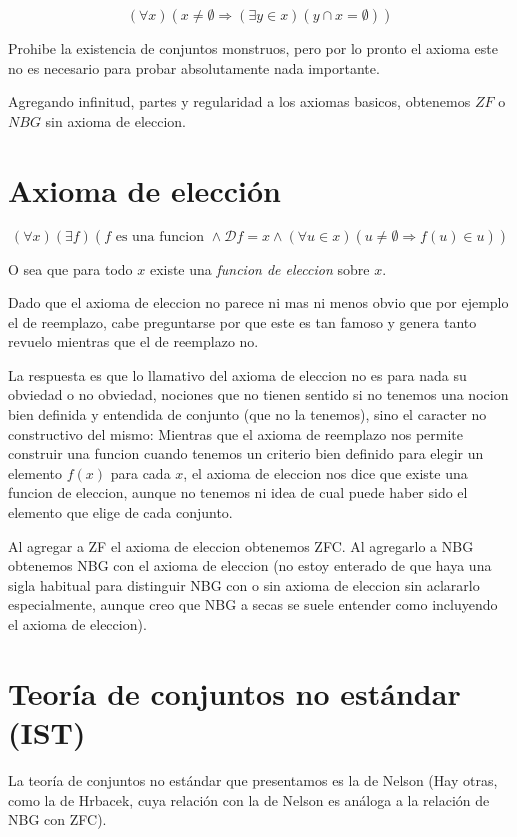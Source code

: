 \documentclass[12pt]{article}
\begin{document}
$$(\forall x) (x \neq \emptyset \Rightarrow (\exists y \in x) (y \cap x = \emptyset))$$

Prohibe la existencia de conjuntos monstruos, pero por lo pronto el axioma este no es necesario para probar absolutamente nada importante.

Agregando infinitud, partes y regularidad a los axiomas basicos, obtenemos $ZF$ o $NBG$ sin axioma de eleccion.

\section{Axioma de elección}


$$(\forall x)(\exists f) (f \mbox{ es una funcion } \wedge \mathcal{D}f = x \wedge (\forall u \in x)(u \neq \emptyset \Rightarrow f(u) \in u))$$

O sea que para todo $x$ existe una \textit{funcion de eleccion} sobre $x$.

Dado que el axioma de eleccion no parece ni mas ni menos obvio que por ejemplo el de reemplazo, cabe preguntarse por que este es tan famoso y
genera tanto revuelo mientras que el de reemplazo no. 

La respuesta es que lo llamativo del axioma de eleccion no es para nada su obviedad o no obviedad, nociones que no tienen
sentido si no tenemos una nocion bien definida y entendida de conjunto (que no la tenemos), sino el caracter no constructivo del mismo:
Mientras que el axioma de reemplazo nos permite construir una funcion cuando tenemos un criterio bien definido para elegir un elemento
$f(x)$ para cada $x$, el axioma de eleccion nos dice que existe una funcion de eleccion, aunque no tenemos ni idea de cual puede haber sido
el elemento que elige de cada conjunto.

Al agregar a ZF el axioma de eleccion obtenemos ZFC. Al agregarlo a NBG obtenemos NBG con el axioma de eleccion (no estoy enterado de que haya
una sigla habitual para distinguir NBG con o sin axioma de eleccion sin aclararlo especialmente, aunque creo que NBG a secas se suele entender
como incluyendo el axioma de eleccion).

\section{Teoría de conjuntos no estándar (IST)}

La teoría de conjuntos no estándar que presentamos es la de Nelson (Hay otras, como la de Hrbacek, cuya relación con la de Nelson es análoga
a la relación de NBG con ZFC).
\end{document}
